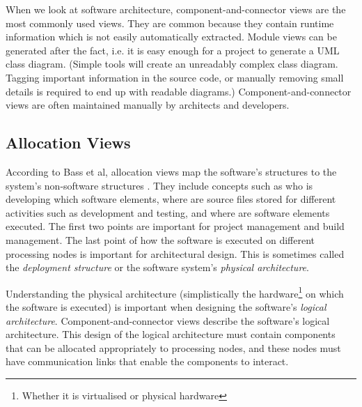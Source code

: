 \noindent
When we look at software architecture, component-and-connector views are the most commonly used views.
They are common because they contain runtime information which is not easily automatically extracted.
Module views can be generated after the fact, i.e. it is easy enough for a project to generate a UML class diagram.
(Simple tools will create an unreadably complex class diagram.
Tagging important information in the source code, or manually removing small details is required to end up with readable diagrams.)
Component-and-connector views are often maintained manually by architects and developers.

\subsection{Allocation Views}
According to Bass et al, allocation views map the software's structures to the system's non-software structures \cite{bass2021software}.
They include concepts such as who is developing which software elements,
where are source files stored for different activities such as development and testing,
and where are software elements executed.
The first two points are important for project management and build management.
The last point of how the software is executed on different processing nodes is important for architectural design.
This is sometimes called the \emph{deployment structure} or the software system's \emph{physical architecture}.

Understanding the physical architecture (simplistically the hardware\footnote{Whether it is virtualised or physical hardware}
on which the software is executed) is important when designing the software's \emph{logical architecture}.
Component-and-connector views describe the software's logical architecture.
This design of the logical architecture must contain components that can be allocated appropriately to processing nodes,
and these nodes must have communication links that enable the components to interact.


